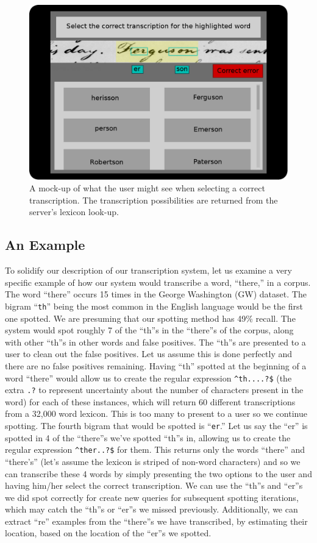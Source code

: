 \documentclass[ms]{byuprop}
\begin{document}
\begin{figure}
    \centering
    \includegraphics[width=.6\textwidth]{userTask_trans}
    \caption{A mock-up of what the user might see when selecting a correct transcription. The transcription possibilities are returned from the server's lexicon look-up.}
    \label{fig:userTask_trans}
\end{figure}


\subsection{An Example}
To solidify our description of our transcription system, let us examine a very specific example of how our system would transcribe a word, ``there,'' in a corpus. The word ``there'' occurs 15 times in the George Washington (GW) dataset\cite{GW}. The bigram ``\texttt{th}'' being the most common in the English language would be the first one spotted. We are presuming that our spotting method has 49\% recall. The system would spot roughly 7 of the ``th''s in the ``there''s of the corpus, along with other ``th''s in other words and false positives. The ``th''s are presented to a user to clean out the false positives. Let us assume this is done perfectly and there are no false positives remaining. Having ``th'' spotted at the beginning of a word ``there'' would allow us to create the regular expression \texttt{{\textasciicircum}th....?\$} (the extra \texttt{.?} to represent uncertainty about the number of characters present in the word) for each of these instances, which will return 60 different transcriptions from a 32,000 word lexicon. This is too many to present to a user so we continue spotting. The fourth bigram that would be spotted is ``\texttt{er}.'' Let us say the ``er'' is spotted in 4 of the ``there''s we've spotted ``th''s in, allowing us to create the regular expression \texttt{{\textasciicircum}ther..?\$} for them. This returns only the words ``there'' and ``there's'' (let's assume the lexicon is striped of non-word characters) and so we can transcribe these 4 words by simply presenting the two options to the user and having him/her select the correct transcription. We can use the ``th''s and ``er''s we did spot correctly for create new queries for subsequent spotting iterations, which may catch the ``th''s or ``er''s we missed previously. Additionally, we can extract  ``re'' examples from the ``there''s we have transcribed, by estimating their location, based on the location of the ``er''s we spotted.
\end{document}
